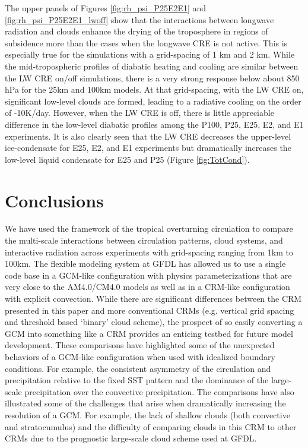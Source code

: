 \documentclass[draft]{agujournal2019}
\begin{document}
  
The upper panels of Figures \ref{fig:rh_psi_P25E2E1} and \ref{fig:rh_psi_P25E2E1_lwoff} show that the 
interactions between longwave radiation and clouds enhance
the drying of the troposphere in regions of subsidence more than the cases when the longwave CRE is not active.  
This is especially true for the simulations with a grid-spacing of 1 km and 2 km.  While the mid-tropospheric 
profiles of diabatic heating and cooling are similar between the LW CRE on/off simulations, there is a very strong 
response below about 850 hPa for the 25km and 100km models.  At that grid-spacing, with the LW CRE on, significant low-level 
clouds are formed, leading to a radiative cooling on the order of -10K/day.   
However, when the LW CRE is off, there is little appreciable difference in the low-level diabatic profiles among the 
P100, P25, E25, E2, and E1 experiments.   It is also clearly seen that the LW CRE decreases the upper-level ice-condensate 
for E25, E2, and E1 experiments but dramatically increases the low-level liquid condensate for E25 and 
P25 (Figure \ref{fig:TotCond}).  

\section{Conclusions}


We have used the framework of the tropical overturning circulation to compare the multi-scale interactions between 
circulation patterns, cloud systems, and interactive radiation across experiments with grid-spacing ranging from 
1km to 100km.  The flexible modeling
system at GFDL has allowed us to use a single code base in a GCM-like configuration with physics parameterizations 
that are very close to the AM4.0/CM4.0 models as well as in a CRM-like configuration with explicit convection.  While 
there are significant differences between the CRM presented in this paper and more conventional CRMs (e.g. vertical 
grid spacing and threshold based `binary' cloud scheme), the prospect of so easily converting a GCM into something 
like a CRM provides an enticing testbed for future model development.
These comparisons have highlighted some of the unexpected behaviors of a GCM-like configuration when used with 
idealized boundary conditions.  For example, the consistent asymmetry of the circulation and precipitation relative 
to the fixed SST pattern and the dominance of the large-scale precipitation over the convective precipitation.  
The comparisons have also illustrated some of the challenges that arise when dramatically increasing the resolution 
of a GCM.  For example, the lack of shallow 
clouds (both convective and stratocumulus) and the difficulty of comparing clouds in this CRM to other CRMs due to the 
prognostic large-scale cloud scheme used at GFDL.
\end{document}
